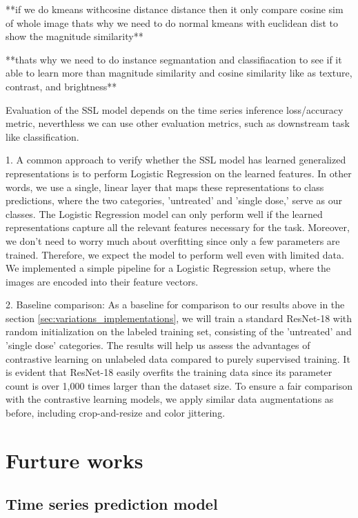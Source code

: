 \documentclass[12pt,twoside,a4paper,parskip]{scrbook} %
\begin{document}
**if we do kmeans withcosine distance distance then it only compare cosine sim of whole image thats why we need to do normal kmeans with euclidean dist to show the magnitude similarity** 

**thats why we need to do instance segmantation and classifiacation to see if it able to learn more than magnitude similarity and cosine similarity like as texture, contrast, and brightness**

Evaluation of the SSL model depends on the  time series inference loss/accuracy metric, neverthless we can use other evaluation metrics, such as downstream task like classification. 

1. A common approach to verify whether the SSL model has learned generalized representations is to perform Logistic Regression on the learned features. In other words, we use a single, linear layer that maps these representations to class predictions, where the two categories, 'untreated' and 'single dose,' serve as our classes. The Logistic Regression model can only perform well if the learned representations capture all the relevant features necessary for the task. Moreover, we don't need to worry much about overfitting since only a few parameters are trained. Therefore, we expect the model to perform well even with limited data. We implemented a simple pipeline for a Logistic Regression setup, where the images are encoded into their feature vectors.

2. Baseline comparison: As a baseline for comparison  to our results above in the section \ref{sec:variations_implementations}, we will train a standard ResNet-18 with random initialization on the labeled training set, consisting of the 'untreated' and 'single dose' categories. The results will help us assess the advantages of contrastive learning on unlabeled data compared to purely supervised training. It is evident that ResNet-18 easily overfits the training data since its parameter count is over 1,000 times larger than the dataset size. To ensure a fair comparison with the contrastive learning models, we apply similar data augmentations as before, including crop-and-resize and color jittering.


\chapter{Furture works}\label{ch:Furture works}
\section{Time series prediction model}
\end{document}
